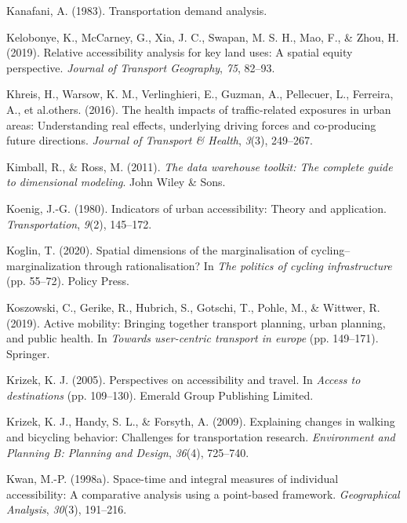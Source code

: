\documentclass[
11pt, %
oneside, %
english, %
singlespacing, %
]{macthesis} %
\newlength{\cslhangindent}
\newenvironment{CSLReferences}[2] %
 {%
  \setlength{\parindent}{0pt}
  \ifodd #1 \everypar{\setlength{\hangindent}{\cslhangindent}}\ignorespaces\fi
  \ifnum #2 > 0
  \setlength{\parskip}{#2\baselineskip}
  \fi
 }%
 {}
\begin{document}
\begin{CSLReferences}{1}{0}
Kanafani, A. (1983). Transportation demand analysis.

Kelobonye, K., McCarney, G., Xia, J. C., Swapan, M. S. H., Mao, F., \& Zhou, H. (2019). Relative accessibility analysis for key land uses: A spatial equity perspective. \emph{Journal of Transport Geography}, \emph{75}, 82--93.

Khreis, H., Warsow, K. M., Verlinghieri, E., Guzman, A., Pellecuer, L., Ferreira, A., et al.others. (2016). The health impacts of traffic-related exposures in urban areas: Understanding real effects, underlying driving forces and co-producing future directions. \emph{Journal of Transport \& Health}, \emph{3}(3), 249--267.

Kimball, R., \& Ross, M. (2011). \emph{The data warehouse toolkit: The complete guide to dimensional modeling}. John Wiley \& Sons.

Koenig, J.-G. (1980). Indicators of urban accessibility: Theory and application. \emph{Transportation}, \emph{9}(2), 145--172.

Koglin, T. (2020). Spatial dimensions of the marginalisation of cycling--marginalization through rationalisation? In \emph{The politics of cycling infrastructure} (pp. 55--72). Policy Press.

Koszowski, C., Gerike, R., Hubrich, S., Gotschi, T., Pohle, M., \& Wittwer, R. (2019). Active mobility: Bringing together transport planning, urban planning, and public health. In \emph{Towards user-centric transport in europe} (pp. 149--171). Springer.

Krizek, K. J. (2005). Perspectives on accessibility and travel. In \emph{Access to destinations} (pp. 109--130). Emerald Group Publishing Limited.

Krizek, K. J., Handy, S. L., \& Forsyth, A. (2009). Explaining changes in walking and bicycling behavior: Challenges for transportation research. \emph{Environment and Planning B: Planning and Design}, \emph{36}(4), 725--740.

Kwan, M.-P. (1998a). Space-time and integral measures of individual accessibility: A comparative analysis using a point-based framework. \emph{Geographical Analysis}, \emph{30}(3), 191--216.


\end{CSLReferences}
\end{document}

